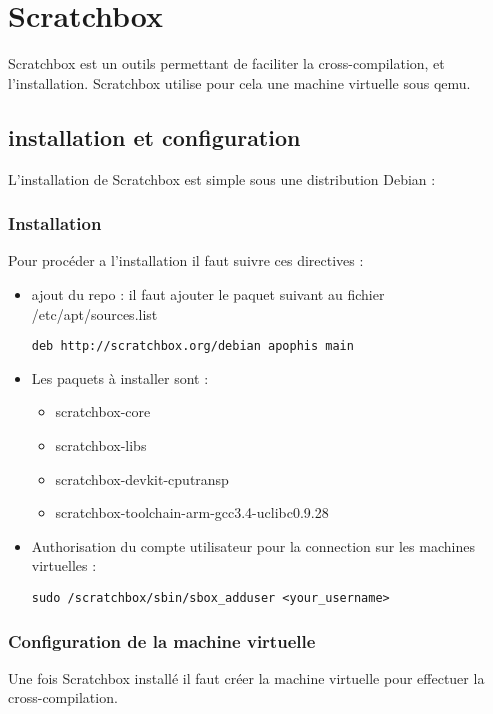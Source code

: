 \chapter{Scratchbox}

Scratchbox est un outils permettant de faciliter la cross-compilation, et l'installation. Scratchbox utilise pour cela une machine virtuelle sous qemu.

\section{installation et configuration}

L'installation de Scratchbox est simple sous une distribution Debian : 

\subsection*{Installation}
Pour procéder a l'installation il faut suivre ces directives  :
\begin{itemize}
	\item ajout du repo  :
		il faut ajouter le paquet suivant au fichier /etc/apt/sources.list
		\begin{lstlisting}
deb http://scratchbox.org/debian apophis main
		\end{lstlisting}
	\item 
		Les paquets à installer sont :
			\begin{itemize}
				\item scratchbox-core
				\item scratchbox-libs
				\item scratchbox-devkit-cputransp
				\item scratchbox-toolchain-arm-gcc3.4-uclibc0.9.28
			\end{itemize}
	\item Authorisation du compte utilisateur pour la connection sur les machines virtuelles : 
	\begin{lstlisting}
sudo /scratchbox/sbin/sbox_adduser <your_username>
	\end{lstlisting}	
\end{itemize}

\subsection*{Configuration de la machine virtuelle}

Une fois Scratchbox installé il faut créer la machine virtuelle pour effectuer la cross-compilation.

